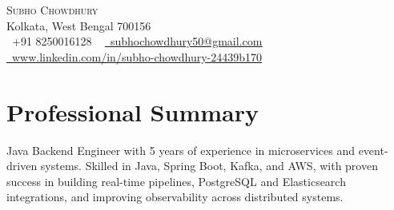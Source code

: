 \documentclass[letterpaper,11pt]{article}
\begin{document}

\begin{center}
    {\Huge \scshape Subho Chowdhury} \\ \vspace{1pt}
    Kolkata, West Bengal 700156 \\ \vspace{1pt}
    \small \raisebox{-0.1\height}\faPhone\ +91 8250016128 ~ \href{mailto:x@gmail.com}{\raisebox{-0.2\height}\faEnvelope\  \underline{subhochowdhury50@gmail.com}} ~ 
    \href{https://linkedin.com/in//}{\raisebox{-0.2\height}\faLinkedin\ \underline{www.linkedin.com/in/subho-chowdhury-24439b170}}  ~

\end{center}
\section{Professional Summary}  
    Java Backend Engineer with 5 years of experience in microservices and event-driven systems. Skilled in Java, Spring Boot, Kafka, and AWS, with proven success in building real-time pipelines, PostgreSQL and Elasticsearch integrations, and improving observability across distributed systems.
%
\end{document}
